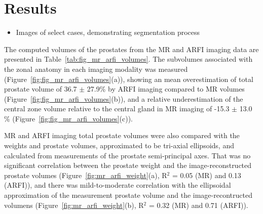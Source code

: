 \section{Results}\label{sect:results}

\begin{itemize}
    \item Images of select cases, demonstrating segmentation process
\end{itemize}

The computed volumes of the prostates from the MR and ARFI imaging data are
presented in Table~\ref{tab:fig_mr_arfi_volumes}.  The subvolumes associated
with the zonal anatomy in each imaging modality was measured
(Figure~\ref{fig:fig_mr_arfi_volumes}(a)), showing an mean overestimation of
total prostate volume of 36.7 $\pm$ 27.9\% by ARFI imaging compared to MR
volumes (Figure~\ref{fig:fig_mr_arfi_volumes}(b)), and a relative
underestimation of the central zone volume relative to the central gland in MR
imaging of -15.3 $\pm$ 13.0 \% (Figure~\ref{fig:fig_mr_arfi_volumes}(c)).





MR and ARFI imaging total prostate volumes were also compared with the weights
and prostate volumes, approximated to be tri-axial ellipsoids, and calculated
from measurements of the prostate semi-principal axes.  That was no significant
correlation between the prostate weight and the image-reconstructed prostate
volumes (Figure~\ref{fig:mr_arfi_weight}(a), R$^2$ = 0.05 (MR) and 0.13
(ARFI)), and there was mild-to-moderate correlation with the ellipsoidal
approximation of the measurement prostate volume and the image-recontructed
volumens (Figure~\ref{fig:mr_arfi_weight}(b), R$^2$ = 0.32 (MR) and 0.71
(ARFI)).




